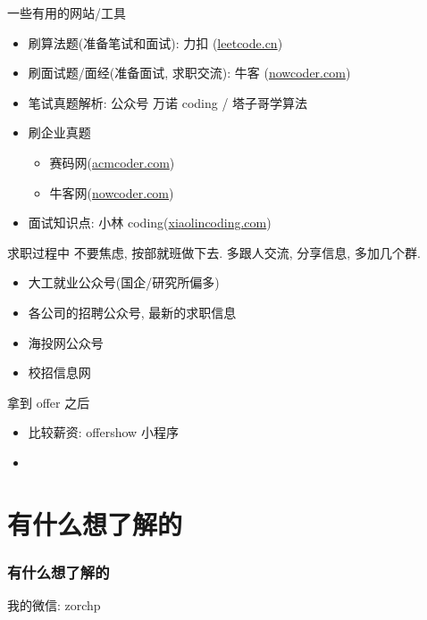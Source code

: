 \documentclass{ctexbeamer}
\begin{document}
\begin{frame}{一些有用的网站/工具}
	\begin{itemize}
		\item 刷算法题(准备笔试和面试): 力扣 (\hyperref[https://leetcode.cn]{leetcode.cn})
		\item 刷面试题/面经(准备面试, 求职交流): 牛客 (\hyperref[https://nowcoder.com]{nowcoder.com})
		\item 笔试真题解析: 公众号 万诺 coding / 塔子哥学算法
		\item 刷企业真题
		      \begin{itemize}
			      \item 赛码网(\hyperref[https://acmcoder.com]{acmcoder.com})
			      \item 牛客网(\hyperref[https://nowcoder.com]{nowcoder.com})
		      \end{itemize}
		\item 面试知识点: 小林 coding(\hyperref[https://xiaolincoding.com]{xiaolincoding.com})
	\end{itemize}
\end{frame}



\begin{frame}{求职过程中}
	不要焦虑, 按部就班做下去. 
	多跟人交流, 分享信息, 多加几个群. 
	\begin{itemize}
		\item 大工就业公众号(国企/研究所偏多)
		\item 各公司的招聘公众号, 最新的求职信息
		\item 海投网公众号
		\item 校招信息网
	\end{itemize}
\end{frame}

\begin{frame}{拿到 offer 之后}
	\begin{itemize}
		\item 比较薪资: offershow 小程序
		\item 
	\end{itemize}
\end{frame}

\section{有什么想了解的}

\begin{frame}
	\frametitle{有什么想了解的}

	我的微信: zorchp
\end{frame}

\begin{frame}{}
	\begin{center}
	\end{center}
\end{frame}
\end{document}

